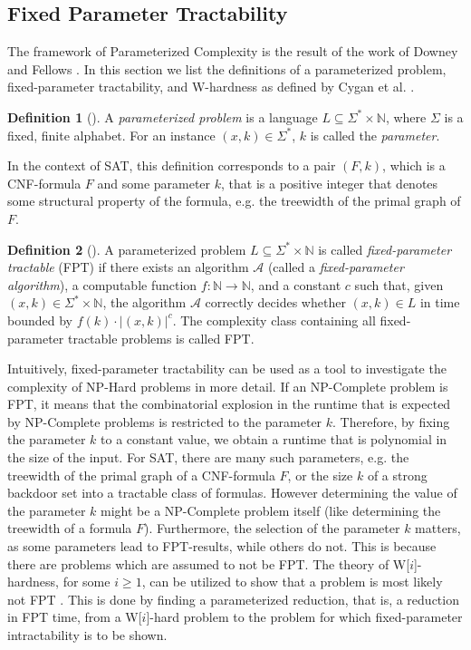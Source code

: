 \documentclass[11pt,a4paper]{article}
\theoremstyle{definition}
\newtheorem{definition}{Definition}[section]
\theoremstyle{proposition}
\begin{document}
\subsection{Fixed Parameter Tractability}
The framework of Parameterized Complexity is the result of the work of Downey and Fellows \cite{downeyFellows}. In this section we list the definitions of a parameterized problem, fixed-parameter tractability, and W-hardness as defined by Cygan et al. \cite{Cygan2015}.
\begin{definition}[{\cite[Chapter 1, p.12]{Cygan2015}}]
A \textit{parameterized problem} is a language $L \subseteq \Sigma^* \times \mathbb{N}$, where $\Sigma$ is a fixed, finite alphabet. For an instance $(x,k) \in \Sigma^*$, $k$ is called the \textit{parameter}.
\end{definition}
In the context of SAT, this definition corresponds to a pair $(F, k)$, which is a CNF-formula $F$ and some parameter $k$, that is a positive integer that denotes some structural property of the formula, e.g. the treewidth of the primal graph of $F$. 
\begin{definition}[{\cite[Chapter 1, p.13]{Cygan2015}}]
A parameterized problem $L \subseteq \Sigma^* \times \mathbb{N}$ is called \textit{fixed-parameter tractable} (FPT) if there exists an algorithm $\mathcal{A}$ (called a \textit{fixed-parameter algorithm}), a computable function $f : \mathbb{N} \to \mathbb{N}$, and a constant $c$ such that, given $(x,k) \in \Sigma^* \times \mathbb{N}$, the algorithm $\mathcal{A}$ correctly decides whether $(x,k) \in L$ in time bounded by $f(k) \cdot |(x,k)|^c$. The complexity class containing all fixed-parameter tractable problems is called FPT. 
\end{definition}
Intuitively, fixed-parameter tractability can be used as a tool to investigate the complexity of NP-Hard problems in more detail. If an NP-Complete problem is FPT, it means that the combinatorial explosion in the runtime that is expected by NP-Complete problems is restricted to the parameter $k$. Therefore, by fixing the parameter $k$ to a constant value, we obtain a runtime that is polynomial in the size of the input. For SAT, there are many such parameters, e.g. the treewidth of the primal graph of a CNF-formula $F$, or the size $k$ of a strong backdoor set into a tractable class of formulas. However determining the value of the parameter $k$ might be a NP-Complete problem itself (like determining the treewidth of a formula $F$). Furthermore, the selection of the parameter $k$ matters, as some parameters lead to FPT-results, while others do not. This is because there are problems which are assumed to not be FPT. The theory of W[$i$]-hardness, for some $i \geq 1$, can be utilized to show that a problem is most likely not FPT \cite[Chapter 13]{Cygan2015}. This is done by finding a parameterized reduction, that is, a reduction in FPT time, from a W[$i$]-hard problem to the problem for which fixed-parameter intractability is to be shown. 
\end{document}
